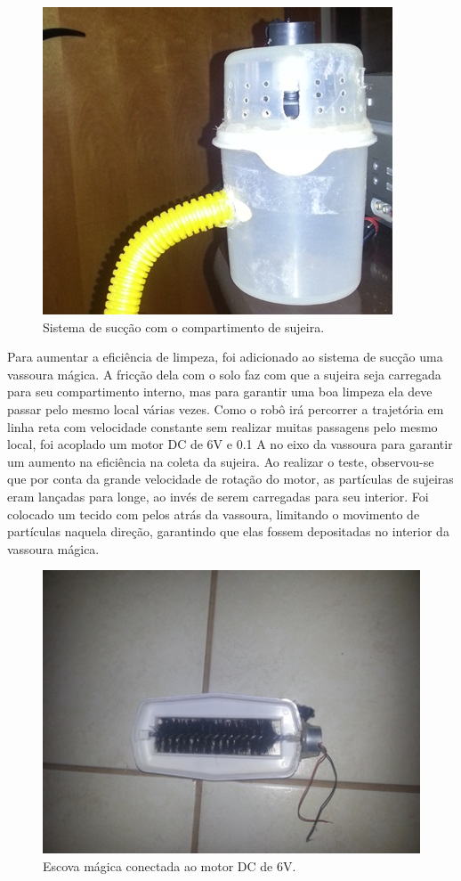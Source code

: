 		\begin{figure}[H]
			\centering
			\includegraphics[scale=1]{figuras/asppc2_10.jpg}
			\caption{Sistema de sucção com o compartimento de sujeira.}
			\label{img:sistema_com_compartimento}
		\end{figure}

		Para aumentar a eficiência de limpeza, foi adicionado ao sistema de sucção uma vassoura mágica. A fricção dela com o solo faz com que a sujeira seja carregada para seu compartimento interno, mas para garantir uma boa limpeza ela deve passar pelo mesmo local várias vezes. Como o robô irá percorrer a trajetória em linha reta com velocidade constante sem realizar muitas passagens pelo mesmo local, foi acoplado um motor DC de 6V e 0.1 A no eixo da vassoura para garantir um aumento na eficiência na coleta da sujeira. Ao realizar o teste, observou-se que por conta da grande velocidade de rotação do motor, as partículas de sujeiras eram lançadas para longe, ao invés de serem carregadas para seu interior. Foi colocado um tecido com pelos atrás da vassoura, limitando o movimento de partículas naquela direção, garantindo que elas fossem depositadas no interior da vassoura mágica.

		\begin{figure}[H]
			\centering
			\includegraphics[scale=1]{figuras/asppc2_11.jpg}
			\caption{Escova mágica conectada ao motor DC de 6V.}
			\label{img:escova_com_motor}
		\end{figure}

